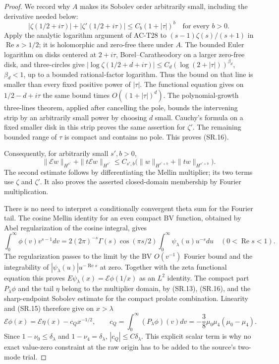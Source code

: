 \begin{proof}
We record why $A$ makes its Sobolev order arbitrarily
small, including the derivative needed below:
\[
 |\zeta(1/2+i\tau)|+|\zeta'(1/2+i\tau)|
                 \leq C_b(1+|\tau|)^b
                         \quad\text{for every }b>0. \tag{SR.16}
\]
Apply the analytic logarithm argument of AC-T28 to
$(s-1)\zeta(s)/(s+1)$ in $\operatorname{Re}s>1/2$;
it is holomorphic and zero-free there under $A$.
The bounded Euler logarithm on disks centered at $2+i\tau$,
Borel--Caratheodory on a larger zero-free disk, and
three-circles give $|\log\zeta(1/2+d+i\tau)|
\leq C_d(\log(2+|\tau|))^{\beta_d}$, $\beta_d<1$,
up to a bounded rational-factor logarithm.
Thus the bound on that line is smaller than every
fixed positive power of $|\tau|$.
The functional equation gives on $1/2-d+i\tau$ the
same bound times $O((1+|\tau|)^d)$.
The polynomial-growth three-lines theorem, applied
after cancelling the pole, bounds the intervening
strip by an arbitrarily small power by choosing
$d$ small.  Cauchy's formula on a fixed smaller disk
in this strip proves the same assertion for $\zeta'$.
The remaining bounded range of $\tau$ is compact and
contains no pole.  This proves (SR.16).

Consequently, for arbitrarily small $s',b>0$,
\[
 \|\mathcal Ew\|_{H^{s'}}+
                 \|t\mathcal Ew\|_{H^{s'}}
       \leq C_{s',b}
          \bigl(\|w\|_{H^{s'+b}}+
                         \|tw\|_{H^{s'+b}}\bigr). \tag{SR.17}
\]
The second estimate follows by differentiating the
Mellin multiplier; its two terms use $\zeta$ and
$\zeta'$.  It also proves the asserted closed-domain
membership by Fourier multiplication.

There is no need to interpret a conditionally convergent
theta sum for the Fourier tail.  The cosine Mellin
identity for an even compact BV function, obtained by
Abel regularization of the cosine integral, gives
\[
 \int_0^\infty\phi(v)v^{s-1}dv
   =2(2\pi)^{-s}\Gamma(s)\cos(\pi s/2)
                     \int_0^\infty\psi_\lambda(u)u^{-s}du
                           \quad(0<\operatorname{Re}s<1).
\]
The regularization passes to the limit by the BV
$O(v^{-1})$ Fourier bound and the integrability of
$|\psi_\lambda(u)|u^{-\operatorname{Re}s}$ at zero.
Together with the zeta functional equation this proves
$E\psi_\lambda(x)=\mathcal E\phi(1/x)$ as an $L^2$
identity.  The compact part $P_\lambda\phi$ and the
tail $\eta$ belong to the multiplier domain, by
(SR.13), (SR.16), and the sharp-endpoint Sobolev
estimate for the compact prolate combination.
Linearity and (SR.15) therefore give on $x>\lambda$
\[
 \mathcal E\phi(x)=\mathcal E\eta(x)-c_Qx^{-1/2},
 \qquad
 c_Q=\int_0^\infty(P_\lambda\phi)(v)dv
       =-\frac38\mu_0\mu_4(\mu_0-\mu_4).
                                                        \tag{SR.18}
\]
Since $1-\nu_0\leq\delta_\lambda$ and
$1-\nu_4=\delta_\lambda$, $|c_Q|\leq C\delta_\lambda$.
This explicit scalar term is why no exact value-zero
constraint at the raw origin has to be added to the
source's two-mode trial.


\end{proof}
